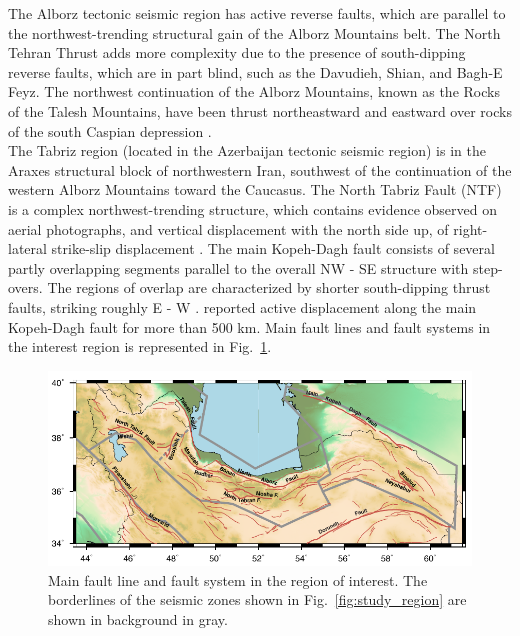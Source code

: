 \noindent
The Alborz tectonic seismic region has active reverse faults, which are parallel to the northwest-trending structural gain of the Alborz Mountains belt. The North Tehran Thrust adds more complexity due to the presence of south-dipping reverse faults, which are in part blind, such as the Davudieh, Shian, and Bagh-E Feyz. The northwest continuation of the Alborz Mountains, known as the Rocks of the Talesh Mountains, have been thrust northeastward and eastward over rocks of the south Caspian depression  \citep{Berberian1999}.\\ 
\noindent
The Tabriz region (located in the Azerbaijan tectonic seismic region) is in the Araxes structural block of northwestern Iran, southwest of the continuation of the western Alborz Mountains toward the Caucasus. The North Tabriz Fault (NTF) is a complex northwest-trending structure, which contains evidence observed on aerial photographs, and vertical displacement with the north side up, of right-lateral strike-slip displacement  \citep{Berberian1999}.
\noindent
The main Kopeh-Dagh fault consists of several partly overlapping segments parallel to the overall  NW - SE  structure with step-overs. The regions of overlap are characterized by shorter south-dipping thrust faults, striking roughly E - W  \citep{Berberian2001}.  \citet{Trifonov1978}  reported active displacement along the main Kopeh-Dagh fault for more than 500 km. Main fault lines and fault systems in the interest region is represented in Fig.~\ref{fig:faults}.


\begin{figure} [ht]
\centering
\includegraphics[scale=1]{figures/pdf/Figure02.pdf} 
\caption{Main fault line and fault system in the region of interest. The borderlines of the seismic zones shown in Fig.~\ref{fig:study_region} are shown in background in gray.}
\label{fig:faults}
\end{figure}


